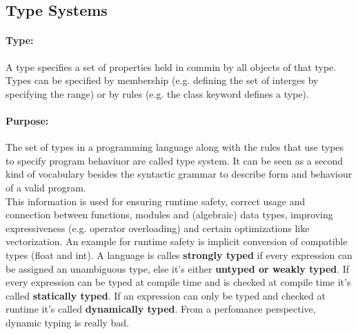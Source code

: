 \subsection{Type Systems}
\paragraph{Type:} A type specifies a set of properties held in commin by all objects of that type. Types can be specified by membership (e.g. defining the set of interges by specifying the range) or by rules (e.g. the class keyword defines a type).
\paragraph{Purpose:}
 The set of types in a programming language along with the rules that use types to specify program behaviuor are called type system. It can be seen as a second kind of vocabulary besides the syntactic grammar to describe form and behaviour of a valid program. \\
 This information is used for ensuring runtime safety, correct usage and connection between functions, modules and (algebraic) data types, improving expressiveness (e.g. operator overloading) and certain optimizations like vectorization. An example for runtime safety is implicit conversion of compatible types (float and int).
 A language is calles \textbf{strongly typed} if every expression can be assigned an unambiguous type, else it's either \textbf{untyped or weakly typed}. If every expression can be typed at compile time and is checked at compile time it's called \textbf{statically typed}. If an expression can only be typed and checked at runtime it's called \textbf{dynamically typed}. From a perfomance perspective, dynamic typing is really bad.

